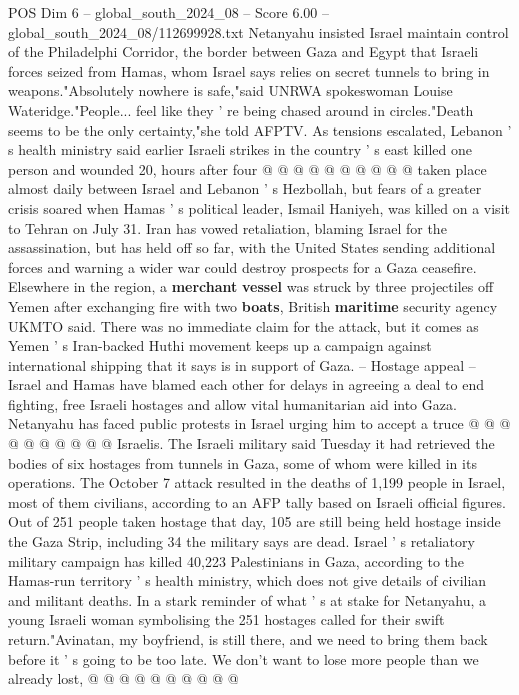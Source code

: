 \begin{textsample}{POS Dim 6 – global\_south\_2024\_08 – Score 6.00 – global\_south\_2024\_08/112699928.txt}
Netanyahu insisted Israel maintain control of the Philadelphi Corridor, the border between Gaza and Egypt that Israeli forces seized from Hamas, whom Israel says relies on secret tunnels to bring in weapons."Absolutely nowhere is safe,"said UNRWA spokeswoman Louise Wateridge."People... feel like they ' re being chased around in circles."Death seems to be the only certainty,"she told AFPTV.
As tensions escalated, Lebanon ' s health ministry said earlier Israeli strikes in the country ' s east killed one person and wounded 20, hours after four @ @ @ @ @ @ @ @ @ @ taken place almost daily between Israel and Lebanon ' s Hezbollah, but fears of a greater crisis soared when Hamas ' s political leader, Ismail Haniyeh, was killed on a visit to Tehran on July 31.
Iran has vowed retaliation, blaming Israel for the assassination, but has held off so far, with the United States sending additional forces and warning a wider war could destroy prospects for a Gaza ceasefire.
Elsewhere in the region, a \textbf{merchant} \textbf{vessel} was struck by three projectiles off Yemen after exchanging fire with two \textbf{boats}, British \textbf{maritime} security agency UKMTO said.
There was no immediate claim for the attack, but it comes as Yemen ' s Iran-backed Huthi movement keeps up a campaign against international shipping that it says is in support of Gaza. -- Hostage appeal -- Israel and Hamas have blamed each other for delays in agreeing a deal to end fighting, free Israeli hostages and allow vital humanitarian aid into Gaza.
Netanyahu has faced public protests in Israel urging him to accept a truce @ @ @ @ @ @ @ @ @ @ Israelis.
The Israeli military said Tuesday it had retrieved the bodies of six hostages from tunnels in Gaza, some of whom were killed in its operations.
The October 7 attack resulted in the deaths of 1,199 people in Israel, most of them civilians, according to an AFP tally based on Israeli official figures.
Out of 251 people taken hostage that day, 105 are still being held hostage inside the Gaza Strip, including 34 the military says are dead.
Israel ' s retaliatory military campaign has killed 40,223 Palestinians in Gaza, according to the Hamas-run territory ' s health ministry, which does not give details of civilian and militant deaths.
In a stark reminder of what ' s at stake for Netanyahu, a young Israeli woman symbolising the 251 hostages called for their swift return."Avinatan, my boyfriend, is still there, and we need to bring them back before it ' s going to be too late.
We don't want to lose more people than we already lost, @ @ @ @ @ @ @ @ @ @

\end{textsample}
